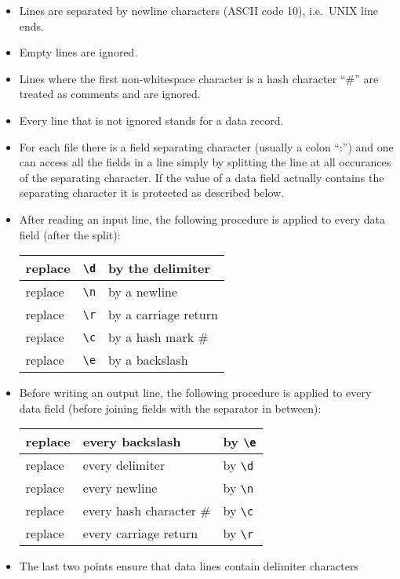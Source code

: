 \documentclass[12pt,openany,a4paper]{book}
\begin{document}
\begin{itemize}
\item Lines are separated by newline characters (ASCII code 10), i.e.~UNIX
line ends.
\item Empty lines are ignored.
\item Lines where the first non-whitespace character is a hash character ``\#''
are treated as comments and are ignored.
\item Every line that is not ignored stands for a data record.
\item For each file there is a field separating character (usually a colon
``:'') and one can access all the fields in a line simply by splitting
the line at all occurances of the separating character. If the value of a 
data field actually contains the separating character it is protected as 
described below.
\item After reading an input line, the following procedure is applied
to every data field (after the split):
\begin{center}
\begin{tabular}{|l|l|l|}
\hline
replace & \verb!\d! & by the delimiter \\
\hline
replace & \verb!\n! & by a newline \\
\hline
replace & \verb!\r! & by a carriage return \\
\hline
replace & \verb!\c! & by a hash mark \# \\
\hline
replace & \verb!\e! & by a backslash \\
\hline
\end{tabular}
\end{center}
\item Before writing an output line, the following procedure is applied
to every data field (before joining fields with the separator in between):
\begin{center}
\begin{tabular}{|l|l|l|}
\hline
replace & every backslash & by \verb!\e! \\
\hline
replace & every delimiter & by \verb!\d! \\
\hline
replace & every newline   & by \verb!\n! \\
\hline
replace & every hash character \# & by \verb!\c! \\
\hline
replace & every carriage return & by \verb!\r! \\
\hline
\end{tabular}
\end{center}
\item The last two points ensure that data lines contain delimiter characters

\end{itemize}
\end{document}
